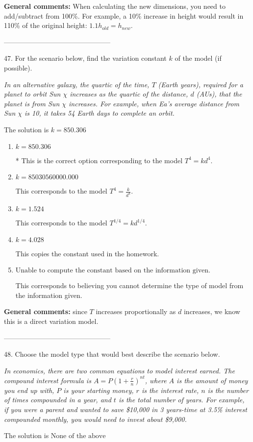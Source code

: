 \documentclass{article}[14pt]
\begin{document}
\textbf{General comments:} When calculating the new dimensions, you need to add/subtract from 100\%. For example, a 10\% increase in height would result in 110\% of the original height: $1.1h_{old} = h_{new}$.

-----------------------------------------------

47. For the scenario below, find the variation constant $k$ of the model (if possible).
\begin{center} \textit{In an alternative galaxy, the quartic of the time, $T$ (Earth years), required for a planet to orbit Sun $\chi$ increases as the quartic of the distance, $d$ (AUs), that the planet is from Sun $\chi$ increases. For example, when Ea's average distance from Sun $\chi$ is 10, it takes 54 Earth days to complete an orbit.} \end{center} 
The solution is $ k = 850.306 $ 

\begin{enumerate}[label=\Alph*.] 
\item $ k = 850.306 $ 

 * This is the correct option corresponding to the model $T^{4} = k d^{4}$. 
\item $ k = 85030560000.000 $ 

 This corresponds to the model $T^{4} = \frac{k}{d^{4}}$. 
\item $ k = 1.524 $ 

 This corresponds to the model $T^{1/4} = k d^{1/4}$. 
\item $ k = 4.028 $ 

 This copies the constant used in the homework. 
\item $ \text{Unable to compute the constant based on the information given.} $ 

 This corresponds to believing you cannot determine the type of model from the information given. 
\end{enumerate} 
 
\textbf{General comments:} since $T$ increases proportionally as $d$ increases, we know this is a direct variation model.

-----------------------------------------------

48. Choose the model type that would best describe the scenario below.
\begin{center} \textit{In economics, there are two common equations to model interest earned. The compound interest formula is $A = P (1 + \frac{r}{n})^{nt}$, where $A$ is the amount of money you end up with, $P$ is your starting money, $r$ is the interest rate, $n$ is the number of times compounded in a year, and $t$ is the total number of years. For example, if you were a parent and wanted to save \$10,000 in 3 years-time at 3.5\% interest compounded monthly, you would need to invest about \$9,000.} \end{center} 
The solution is $ \text{None of the above} $ 
\end{document}
